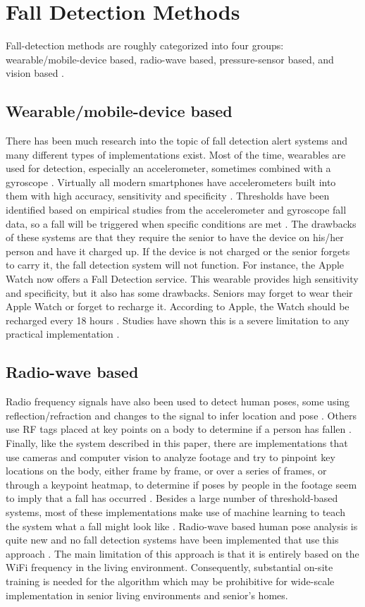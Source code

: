 \section{Fall Detection Methods}

Fall-detection methods are roughly categorized into four groups: wearable/mobile-device based, radio-wave based, pressure-sensor based, and vision based \cite{RN1012}.

\subsection{Wearable/mobile-device based}
There has been much research into the topic of fall detection alert systems and many different types of implementations exist. Most of the time, wearables are used for detection, especially an accelerometer, sometimes combined with a gyroscope \cite{fda2007, RN999, RN1007}. Virtually all modern smartphones have accelerometers built into them with high accuracy, sensitivity and specificity \cite{RN1034}. Thresholds have been identified based on empirical studies from the accelerometer and gyroscope fall data, so a fall will be triggered when specific conditions are met \cite{RN1034}. The drawbacks of these systems are that they require the senior to have the device on his/her person and have it charged up. If the device is not charged or the senior forgets to carry it, the fall detection system will not function. For instance, the Apple Watch now offers a Fall Detection service. This wearable provides high sensitivity and specificity, but it also has some drawbacks. Seniors may forget to wear their Apple Watch or forget to recharge it. According to Apple, the Watch should be recharged every 18 hours \cite{RN1014}. Studies have shown this is a severe limitation to any practical implementation \cite{RN1014}.


\subsection{Radio-wave based}
Radio frequency signals have also been used to detect human poses, some using reflection/refraction and changes to the signal to infer location and pose \cite{Wang2017}. Others use RF tags placed at key points on a body to determine if a person has fallen \cite{Lustrek2009}. Finally, like the system described in this paper, there are implementations that use cameras and computer vision to analyze footage and try to pinpoint key locations on the body, either frame by frame, or over a series of frames, or through a keypoint heatmap, to determine if poses by people in the footage seem to imply that a fall has occurred \cite{RN1006}. Besides a large number of threshold-based systems, most of these implementations make use of machine learning to teach the system what a fall might look like \cite{RN1006}.  Radio-wave based human pose analysis is quite new and no fall detection systems have been implemented that use this approach \cite{RN1005}. The main limitation of this approach is that it is entirely based on the WiFi frequency in the living environment. Consequently, substantial on-site training is needed for the algorithm which may be prohibitive for wide-scale implementation in senior living environments and senior’s homes.


